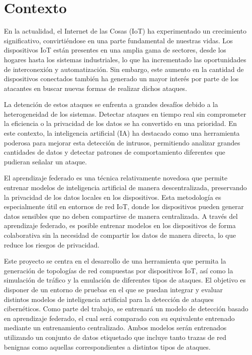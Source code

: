 
\section{Contexto}
\label{sec:Contexto}
En la actualidad, el Internet de las Cosas (IoT) ha experimentado un crecimiento significativo, convirtiéndose en una parte fundamental de nuestras vidas. Los dispositivos IoT están presentes en una amplia gama de sectores, desde los hogares hasta los sistemas industriales, lo que ha incrementado las oportunidades de interconexión y automatización. Sin embargo, este aumento en la cantidad de dispositivos conectados también ha generado un mayor interés por parte de los atacantes en buscar nuevas formas de realizar dichos ataques.

La detención de estos ataques se enfrenta a  grandes desafíos debido a la heterogeneidad de los sistemas. Detectar ataques en tiempo real sin comprometer la eficiencia o la privacidad de los datos se ha convertido en una prioridad. En este contexto, la inteligencia artificial (IA) ha destacado como una herramienta poderosa para mejorar esta detección de intrusos, permitiendo analizar grandes cantidades de datos y detectar patrones de comportamiento diferentes que pudieran señalar un ataque.

El aprendizaje federado es una técnica relativamente novedosa que permite entrenar modelos de inteligencia artificial de manera descentralizada, preservando la privacidad de los datos locales en los dispositivos. Esta metodología es especialmente útil en entornos de red IoT, donde los dispositivos pueden generar datos sensibles que no deben compartirse de manera centralizada. A través del aprendizaje federado, es posible entrenar modelos en los dispositivos de forma colaborativa sin la necesidad de compartir los datos de manera directa, lo que reduce los riesgos de privacidad.

Este proyecto se centra en el desarrollo de una herramienta que permita la generación de topologías de red compuestas por dispositivos IoT, así como la simulación de tráfico y la emulación de diferentes tipos de ataques. El objetivo es disponer de un entorno de pruebas en el que se puedan integrar y evaluar distintos modelos de inteligencia artificial para la detección de ataques cibernéticos. Como parte del trabajo, se entrenará un modelo de detección basado en aprendizaje federado, el cual será comparado con su equivalente entrenado mediante un entrenamiento centralizado. Ambos modelos serán entrenados utilizando un conjunto de datos etiquetado que incluye tanto trazas de red benignas como aquellas correspondientes a distintos tipos de ataques.

